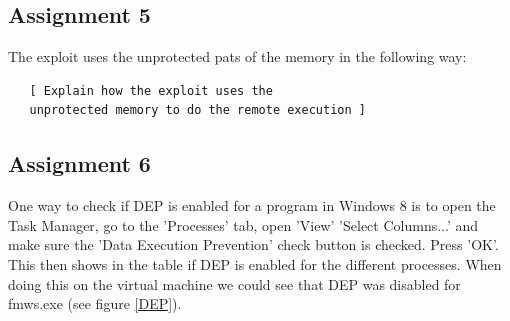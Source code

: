 \documentclass[10pt]{article}
\newcommand{\escape}[1]{\PVerb{#1}}
\begin{document}



    \subsection{Assignment 5}

      The exploit uses the unprotected pats of the memory in the following way:

      \begin{verbatim}
   [ Explain how the exploit uses the
   unprotected memory to do the remote execution ]
      \end{verbatim}

    \subsection{Assignment 6}
One way to check if DEP is enabled for a program in Windows 8 is to open the Task Manager, go to the 'Processes' tab, open 'View' \escape{>} 'Select Columns...' and make sure the 'Data Execution Prevention' check button is checked. Press 'OK'. This then shows in the table if DEP is enabled for the different processes. When doing this on the virtual machine we could see that DEP was disabled for fmws.exe (see figure \ref{DEP}).
\end{document}
